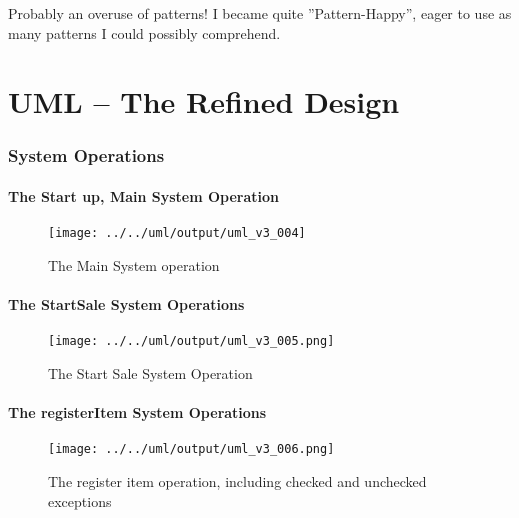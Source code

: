 \documentclass[a4paper]{scrreprt}
\begin{document}
Probably an overuse of patterns!
I became quite ''Pattern-Happy'', eager to use as many patterns I could possibly comprehend.
\appendix
\chapter{UML -- The Refined Design}
\subsection*{System Operations}
\subsubsection*{The Start up, Main System Operation}
\begin{figure}[H]
    \begin{center}
        \texttt{[image: ../../uml/output/uml\_v3\_004]}
        \caption{The Main System operation}
        \label{fig:start-up}
    \end{center}
\end{figure}
%
\subsubsection*{The StartSale System Operations}
\begin{figure}[H]
    \begin{center}
        \texttt{[image: ../../uml/output/uml\_v3\_005.png]}
        \caption{The Start Sale System Operation}
        \label{fig:start-sale}
    \end{center}
\end{figure}
\subsubsection*{The registerItem System Operations}
\begin{figure}[H]
    \begin{center}
        \texttt{[image: ../../uml/output/uml\_v3\_006.png]}
        \caption{The register item operation, including checked and unchecked exceptions}
        \label{fig:reg-item}
    \end{center}
\end{figure}
\end{document}
